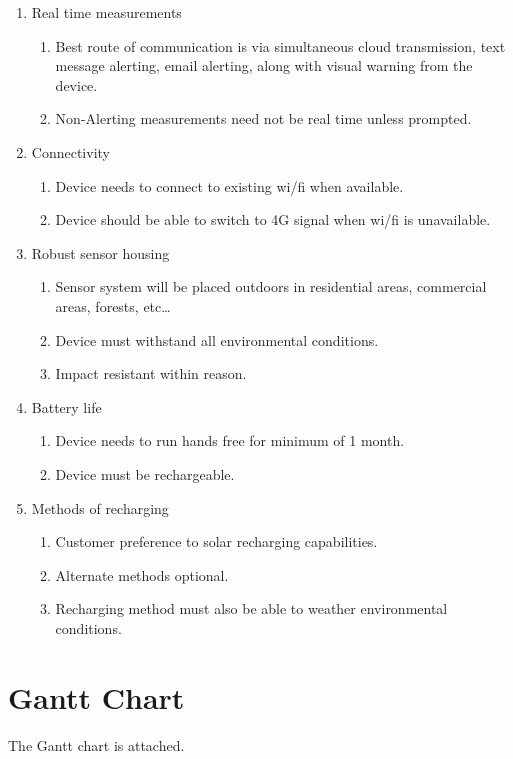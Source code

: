 \documentclass[12pt]{article}
\begin{document}
\begin{enumerate}
	\item Real time measurements
	\begin{enumerate}
		\item Best route of communication is via simultaneous cloud transmission, text message alerting, email alerting, along with visual warning from the device.
		\item Non-Alerting measurements need not be real time unless prompted.
	\end{enumerate}
	\item Connectivity
	\begin{enumerate}
		\item Device needs to connect to existing wi/fi when available.
		\item Device should be able to switch to 4G signal when wi/fi is unavailable.
	\end{enumerate}
	\item Robust sensor housing
	\begin{enumerate}
		\item Sensor system will be placed outdoors in residential areas, commercial areas, forests, etc\dots 
		\item Device must withstand all environmental conditions.
		\item Impact resistant within reason. 
	\end{enumerate}
	\item Battery life
	\begin{enumerate}
		\item Device needs to run hands free for minimum of 1 month.
		\item Device must be rechargeable.
	\end{enumerate}
	\item Methods of recharging
	\begin{enumerate}
		\item Customer preference to solar recharging capabilities.
		\item Alternate methods optional.
		\item Recharging method must also be able to weather environmental conditions.
	\end{enumerate}
\end{enumerate}


\section{Gantt Chart}

The Gantt chart is attached.
\end{document}
